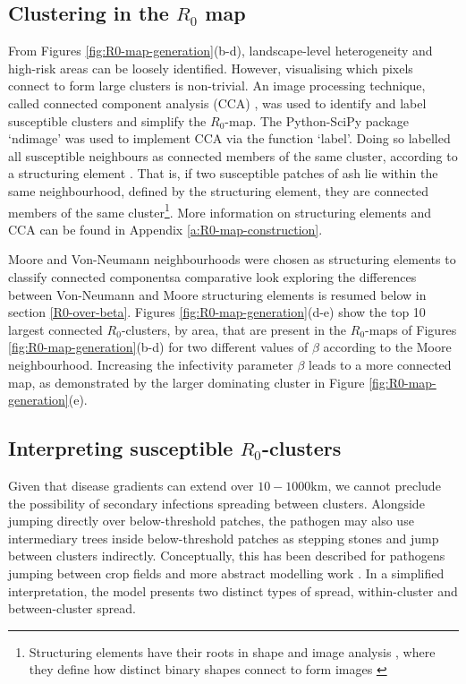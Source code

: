 \subsection{Clustering in the $R_0$ map}

From Figures \ref{fig:R0-map-generation}(b-d), landscape-level heterogeneity and high-risk areas can be loosely identified.
However, visualising which pixels connect to form large clusters is non-trivial. 
An image processing technique, called connected component analysis (CCA) \cite{CCA1, CCA2}, was used to identify and label susceptible clusters and simplify the $R_0$-map. 
The Python-SciPy package `ndimage' \cite{scipy} was used to implement CCA via the function `label'. 
Doing so labelled all susceptible neighbours as connected members of the same cluster, according to a structuring element \cite{liang1989erosion}. 
That is, if two susceptible patches of ash lie within the same neighbourhood, defined by the structuring element, they are connected members of the same cluster\footnote{Structuring elements have their roots in shape and image analysis \cite{23111}, where they define how distinct binary shapes connect to form images \cite{liang1989erosion, nachtegael2001connections}}. 
More information on structuring elements and CCA can be found in Appendix \ref{a:R0-map-construction}.%

Moore and Von-Neumann neighbourhoods were chosen as structuring elements to classify connected components\textemdash a comparative look exploring the differences between Von-Neumann and Moore 
structuring elements is resumed below in section \ref{R0-over-beta}.  
Figures \ref{fig:R0-map-generation}(d-e) show the top 10 largest connected $R_0$-clusters, by area, that are present in the $R_0$-maps of Figures \ref{fig:R0-map-generation}(b-d) for two different values of $\beta$ 
according to the Moore neighbourhood.
Increasing the infectivity parameter $\beta$ leads to a more connected map, as demonstrated by the larger dominating cluster in Figure \ref{fig:R0-map-generation}(e).

\subsection{Interpreting susceptible $R_0$-clusters}
Given that disease gradients can extend over $10-1000\mathrm{km}$, we cannot preclude the possibility of secondary infections spreading between clusters.
Alongside jumping directly over below-threshold patches, the pathogen may also use intermediary trees inside below-threshold patches as stepping stones and jump between clusters indirectly. 
Conceptually, this has been described for pathogens jumping between crop fields \cite{Gilligan-disease-management} and more abstract modelling work \cite{wingen2013long}.
In a simplified interpretation, the model presents two distinct types of spread, within-cluster and between-cluster spread. 

